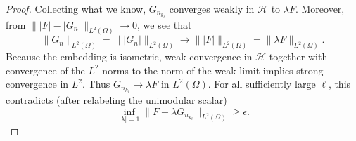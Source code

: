 \documentclass[10pt,a4paper]{amsart}
\begin{document}
\begin{proof}
Collecting what we know, \(G_{n_{k_\ell}}\) converges weakly in \(\mathcal{H}\) to
\(\lambda F\). Moreover, from
\(\lVert \lvert F \rvert-\lvert G_n \rvert \rVert_{L^2(\Omega)}\to0\), we see that
\[
\lVert G_n \rVert_{L^2(\Omega)}=\lVert \lvert G_n \rvert \rVert_{L^2(\Omega)}
\to
\lVert \lvert F \rvert \rVert_{L^2(\Omega)}
=\lVert \lambda F \rVert_{L^2(\Omega)}.
\]
Because the embedding is isometric, weak convergence in \(\mathcal{H}\) together with
convergence of the \(L^2\)-norms to the norm of the weak limit implies strong
convergence in \(L^2\). Thus \(G_{n_{k_\ell}}\to\lambda F\) in
\(L^2(\Omega)\). For all sufficiently large \(\ell\), this contradicts (after relabeling the unimodular scalar)
\[
\inf_{\lvert \lambda \rvert=1}
\lVert F-\lambda G_{n_{k_\ell}} \rVert_{L^2(\Omega)}
\ge \epsilon.
\]
\end{proof}
\end{document}
